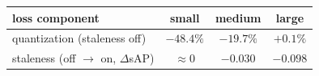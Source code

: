 \begin{tabular}{lccc}
\toprule
loss component & small & medium & large \\
\midrule
quantization (staleness off) & $-48.4\%$ & $-19.7\%$ & $+0.1\%$ \\
staleness (off $\to$ on, $\Delta$sAP) & $\approx 0$ & $-0.030$ & $-0.098$ \\
\bottomrule
\end{tabular}
